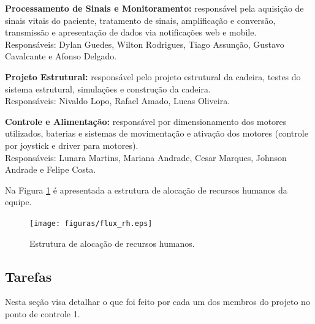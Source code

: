 \textbf{Processamento de Sinais e Monitoramento:} responsável pela aquisição de sinais vitais do paciente,
tratamento de sinais, amplificação e conversão, transmissão e apresentação de
dados via notificações web e mobile.
\\Responsáveis: Dylan Guedes, Wilton Rodrigues, Tiago Assunção, Gustavo Cavalcante e Afonso Delgado.

\textbf{Projeto Estrutural:} responsável pelo projeto estrutural da cadeira, testes
do sistema estrutural, simulações e construção da cadeira.
\\Responsáveis: Nivaldo Lopo, Rafael Amado, Lucas Oliveira.

\textbf{Controle e Alimentação:} responsável por dimensionamento dos motores utilizados,
baterias e sistemas de movimentação e ativação dos motores (controle por
joystick e driver para motores).
\\Responsáveis: Lunara Martins, Mariana Andrade, Cesar Marques, Johnson Andrade e Felipe Costa.

Na Figura \ref{flux_rh} é apresentada a estrutura de alocação de recursos humanos da equipe.


\begin{figure}[h]
    \centering
    \label{flux_rh}
    \texttt{[image: figuras/flux\_rh.eps]}
    \caption{Estrutura de alocação de recursos humanos.}
\end{figure}

\subsection{Tarefas}

Nesta seção visa detalhar o que foi feito por cada um dos membros do projeto no ponto de controle 1.

